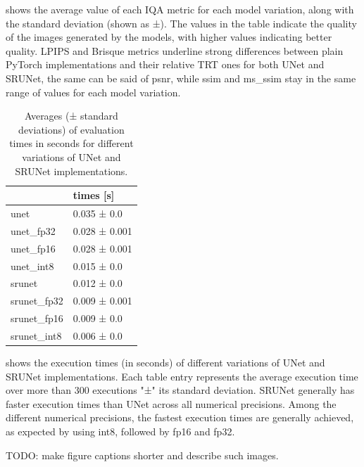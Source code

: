  shows the average value of each IQA metric for each model variation, along with the standard deviation (shown as ±). The values in the table indicate the quality of the images generated by the models, with higher values indicating better quality.
LPIPS and Brisque metrics underline strong differences between plain PyTorch implementations and their relative TRT ones for both UNet and SRUNet, the same can be said of psnr, while ssim and ms\_ssim stay in the same range of values for each model variation.

\begin{table}[t]
\begin{tabular}{ll}
\toprule
{} &      times [s] \\
\midrule
unet        &    0.035 ± 0.0 \\
unet\_fp32   &  0.028 ± 0.001 \\
unet\_fp16   &  0.028 ± 0.001 \\
unet\_int8   &    0.015 ± 0.0 \\
srunet      &    0.012 ± 0.0 \\
srunet\_fp32 &  0.009 ± 0.001 \\
srunet\_fp16 &    0.009 ± 0.0 \\
srunet\_int8 &    0.006 ± 0.0 \\
\bottomrule
\end{tabular}
\caption{Averages (± standard deviations) of evaluation times in seconds for different variations of UNet and SRUNet implementations.}
\label{tab:tab2}
\end{table}

 shows the execution times (in seconds) of different variations of UNet and SRUNet implementations. Each table entry represents the average execution time over more than 300 executions "±" its standard deviation. SRUNet generally has faster execution times than UNet across all numerical precisions. Among the different numerical precisions, the fastest execution times are generally achieved, as expected by using int8, followed by fp16 and fp32.

TODO: make figure captions shorter and describe such images.

